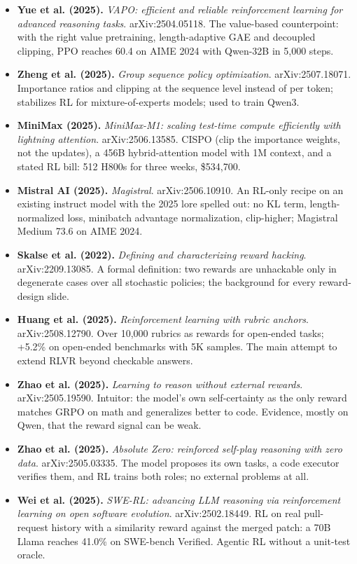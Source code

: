 \begin{itemize}[leftmargin=1.2em,itemsep=3pt]
\item \textbf{Yue et al. (2025).} \textit{VAPO: efficient and reliable reinforcement learning for advanced reasoning tasks}. arXiv:2504.05118. The value-based counterpoint: with the right value pretraining, length-adaptive GAE and decoupled clipping, PPO reaches 60.4 on AIME 2024 with Qwen-32B in 5,000 steps.
\item \textbf{Zheng et al. (2025).} \textit{Group sequence policy optimization}. arXiv:2507.18071. Importance ratios and clipping at the sequence level instead of per token; stabilizes RL for mixture-of-experts models; used to train Qwen3.
\item \textbf{MiniMax (2025).} \textit{MiniMax-M1: scaling test-time compute efficiently with lightning attention}. arXiv:2506.13585. CISPO (clip the importance weights, not the updates), a 456B hybrid-attention model with 1M context, and a stated RL bill: 512 H800s for three weeks, \$534,700.
\item \textbf{Mistral AI (2025).} \textit{Magistral}. arXiv:2506.10910. An RL-only recipe on an existing instruct model with the 2025 lore spelled out: no KL term, length-normalized loss, minibatch advantage normalization, clip-higher; Magistral Medium 73.6 on AIME 2024.
\item \textbf{Skalse et al. (2022).} \textit{Defining and characterizing reward hacking}. arXiv:2209.13085. A formal definition: two rewards are unhackable only in degenerate cases over all stochastic policies; the background for every reward-design slide.
\item \textbf{Huang et al. (2025).} \textit{Reinforcement learning with rubric anchors}. arXiv:2508.12790. Over 10,000 rubrics as rewards for open-ended tasks; +5.2\% on open-ended benchmarks with 5K samples. The main attempt to extend RLVR beyond checkable answers.
\item \textbf{Zhao et al. (2025).} \textit{Learning to reason without external rewards}. arXiv:2505.19590. Intuitor: the model's own self-certainty as the only reward matches GRPO on math and generalizes better to code. Evidence, mostly on Qwen, that the reward signal can be weak.
\item \textbf{Zhao et al. (2025).} \textit{Absolute Zero: reinforced self-play reasoning with zero data}. arXiv:2505.03335. The model proposes its own tasks, a code executor verifies them, and RL trains both roles; no external problems at all.
\item \textbf{Wei et al. (2025).} \textit{SWE-RL: advancing LLM reasoning via reinforcement learning on open software evolution}. arXiv:2502.18449. RL on real pull-request history with a similarity reward against the merged patch: a 70B Llama reaches 41.0\% on SWE-bench Verified. Agentic RL without a unit-test oracle.

\end{itemize}
